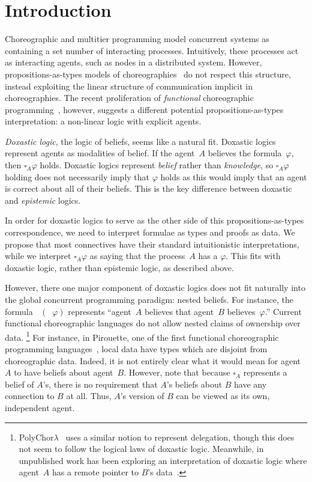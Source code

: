 \section{Introduction}
\label{sec:introduction}

Choreographic and multitier programming model concurrent systems as containing a set number of interacting processes.
Intuitively, these processes act as interacting agents, such as nodes in a distributed system.
However, propositions-as-types models of choreographies~\cite{CarboneMS14} do not respect this structure, instead exploiting the linear structure of communication implicit in choreographies.
The recent proliferation of \emph{functional} choreographic programming~\cite{HirschG22,GraversenHM23,CruzFilipeGLMP21}, however, suggests a different potential propositions-as-types interpretation: a non-linear logic with explicit agents.

\emph{Doxastic logic}, the logic of beliefs, seems like a natural fit.
Doxastic logics represent agents as modalities of belief.
If the agent~$A$ believes the formula~$\varphi$, then $\square_A \varphi$ holds.
Doxastic logics represent \emph{belief} rather than \emph{knowledge}, so $\square_A \varphi$ holding does not necessarily imply that $\varphi$ holds as this would imply that an agent is correct about all of their beliefs.
This is the key difference between doxastic and \emph{epistemic} logics.

In order for doxastic logics to serve as the other side of this propositions-as-types correspondence, we need to interpret formulae as types and proofs as data.
We propose that most connectives have their standard intuitionistic interpretations, while we interpret $\square_A \varphi$ as saying that the process~$A$ has a $\varphi$.
This fits with doxastic logic, rather than epistemic logic, as described above.

However, there one major component of doxastic logics does not fit naturally into the global concurrent programming paradigm: nested beliefs.
For instance, the formula $\mathop{\square_A} (\mathop{\square_B} \varphi)$ represents ``agent~$A$ believes that agent~$B$ believes~$\varphi$.''
Current functional choreographic languages do not allow nested claims of ownership over data.%
\footnote{PolyChor$\lambda$~\cite{GraversenHM23} uses a similar notion to represent delegation, though this does not seem to follow the logical laws of doxastic logic.
Meanwhile, in unpublished work \citeauthor{Kavvos24} has been exploring an interpretation of doxastic logic where agent~$A$ has a remote pointer to $B$'s data~\cite{Kavvos24}.}
For instance, in Pirouette, one of the first functional choreographic programming languages~\cite{HirschG22}, local data have types which are disjoint from choreographic data.
Indeed, it is not entirely clear what it would mean for agent~$A$ to have beliefs about agent~$B$.
However, note that because $\square_A$ represents a belief of $A$'s, there is no requirement that $A$'s beliefs about $B$ have any connection to $B$ at all.
Thus, $A$'s version of $B$ can be viewed as its own, independent agent.

